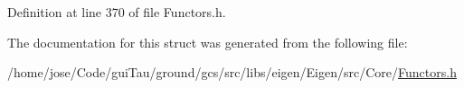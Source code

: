 Definition at line 370 of file Functors.\-h.



The documentation for this struct was generated from the following file\-:\begin{DoxyCompactItemize}
\item 
/home/jose/\-Code/gui\-Tau/ground/gcs/src/libs/eigen/\-Eigen/src/\-Core/\hyperlink{_core_2_functors_8h}{Functors.\-h}\end{DoxyCompactItemize}
